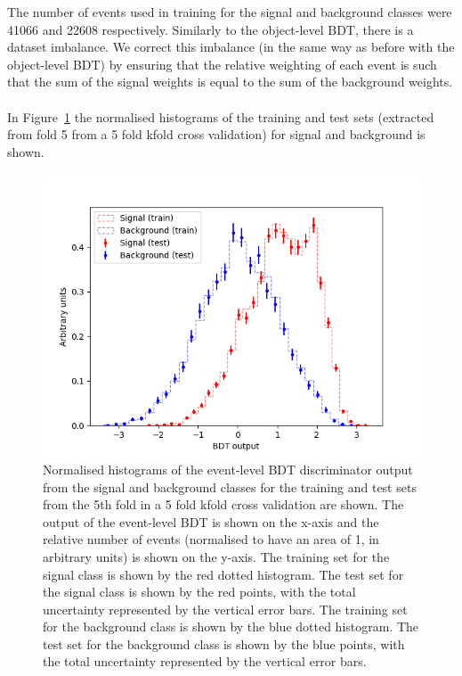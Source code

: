 The number of events used in training for the signal and background classes were 41066 and 22608 respectively. Similarly to the object-level BDT, there is a dataset imbalance. We correct this imbalance (in the same way as before with the object-level BDT) by ensuring that the relative weighting of each event is such that the sum of the signal weights is equal to the sum of the background weights.\\\\

In Figure~\ref{fig:event-bdt-overtrain-check} the normalised histograms of the training and test sets (extracted from fold 5 from a 5 fold kfold cross validation) for signal and background is shown.
\begin{figure}[h!]
	\includegraphics[scale=0.8]{figures/overtrainingCheck_4lep_event.png}
	\centering
	\caption{Normalised histograms of the event-level BDT discriminator output from the signal and background classes for the training and test sets from the 5th fold in a 5 fold kfold cross validation are shown. The output of the event-level BDT is shown on the x-axis and the relative number of events (normalised to have an area of 1, in arbitrary units) is shown on the y-axis. The training set for the signal class is shown by the red dotted histogram. The test set for the signal class is shown by the red points, with the total uncertainty represented by the vertical error bars. The training set for the background class is shown by the blue dotted histogram. The test set for the background class is shown by the blue points, with the total uncertainty represented by the vertical error bars.}
	\label{fig:event-bdt-overtrain-check}
\end{figure}

